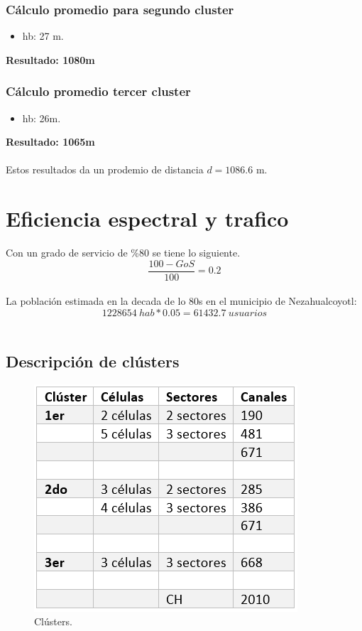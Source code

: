 \documentclass[11pt,letterpaper]{article}
\begin{document}
\subsubsection{Cálculo promedio para segundo cluster}
\begin{itemize}
    \item hb: 27 m.
\end{itemize}
\textbf{Resultado: 1080m}

\subsubsection{Cálculo promedio tercer cluster}
\begin{itemize}
    \item hb: 26m.
\end{itemize}
\textbf{Resultado: 1065m}
\\ \\
Estos resultados da un prodemio de distancia $d=1086.6$ m.

\newpage
\section{Eficiencia espectral y trafico}
Con un grado de servicio de \%80 se tiene lo siguiente.
\begin{equation}
    \frac{100-GoS}{100}=0.2
\end{equation}
\\
La población estimada en la decada de lo 80s en el municipio de Nezahualcoyotl:
\begin{equation}
    1228654 \ hab * 0.05 = 61432.7 \ usuarios
\end{equation}
\\
\subsection{Descripción de clústers}
\begin{figure}[ht]
    \centering
    \includegraphics[width=.5\textwidth]{imagenes/t12.png}
    \caption{Clústers.}
\end{figure}
\end{document}
